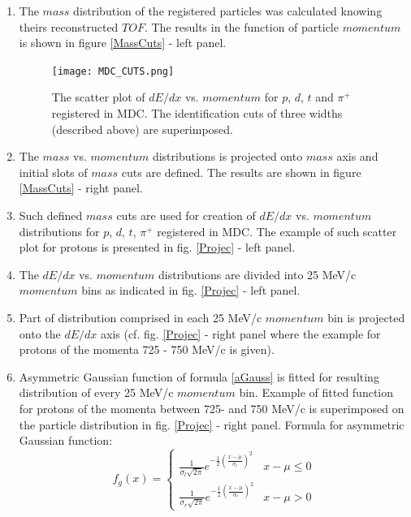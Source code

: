 \begin{enumerate}
	\item The $mass$ distribution of the registered particles was calculated knowing theirs reconstructed $TOF$.  
	The results in the function of particle $momentum$ is shown in figure \ref{MassCuts} - left panel. 
    \begin{figure}[!ht]
   	\centering
   	\texttt{[image: MDC\_CUTS.png]}
   	\caption{The scatter plot of $dE/dx$ vs. $momentum$ for $p$, $d$, $t$ and $\pi^+$ registered in MDC. The identification cuts of three widths 
   	(described above) are superimposed. 
    }
   	\label{MDCcut}
   \end{figure}
	\item The $mass$ vs. $momentum$ distributions is projected onto $mass$ axis and initial slots of $mass$ cuts are defined. 
	The results are shown in figure \ref{MassCuts} - right panel. 
	\item Such defined $mass$ cuts are used for creation of $dE/dx$ vs. $momentum$ distributions for $p$, $d$, $t$, $\pi^+$ registered in MDC. 
	The example of such scatter plot for protons is presented in fig. \ref{Projec} - left panel.
    \item The $dE/dx$ vs. $momentum$ distributions are divided into 25 MeV/c $momentum$ bins as indicated in fig. \ref{Projec} - left panel.
    \item Part of distribution comprised in each 25 MeV/c $momentum$ bin is projected onto the $dE/dx$ axis 
    (cf. fig. \ref{Projec} - right panel where the example for protons of the momenta 725 - 750 MeV/c is given).
   \item Asymmetric Gaussian function of formula \ref{aGauss} is fitted for resulting distribution of every 25 MeV/c $momentum$ bin. Example of fitted function 
   for protons of the momenta between 725- and 750 MeV/c is superimposed on the particle distribution in fig. \ref{Projec} - right panel. 
   Formula for asymmetric Gaussian function:
    \begin{equation}
   	f_g(x)=\begin{cases}
   		\frac{1}{\sigma_l\sqrt{2\pi}}e^{-\frac{1}{2}\left(\frac{x-\mu}{\sigma_l}\right)^2}&x-\mu\le0\\
   		\frac{1}{\sigma_r\sqrt{2\pi}}e^{-\frac{1}{2}\left(\frac{x-\mu}{\sigma_r}\right)^2}&x-\mu>0
   	\end{cases}
   \label{aGauss}
   \end{equation}
   

\end{enumerate}
